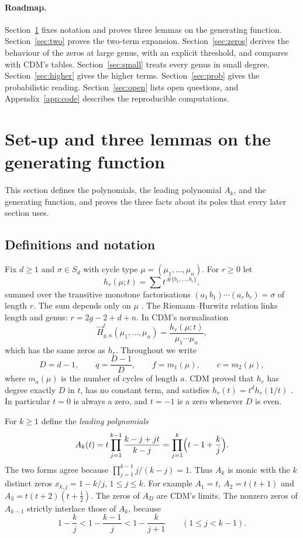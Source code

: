 \documentclass[11pt,a4paper]{article}
\theoremstyle{definition}\newtheorem{definition}[theorem]{Definition}
\theoremstyle{remark}\newtheorem{remark}[theorem]{Remark}\newtheorem{example}[theorem]{Example}
\numberwithin{equation}{section}
\begin{document}
\paragraph{Roadmap.}
Section~\ref{sec:setup} fixes notation and proves three lemmas on the generating function. Section~\ref{sec:two} proves the two-term expansion. Section~\ref{sec:zeros} derives the behaviour of the zeros at large genus, with an explicit threshold, and compares with CDM's tables. Section~\ref{sec:small} treats every genus in small degree. Section~\ref{sec:higher} gives the higher terms. Section~\ref{sec:prob} gives the probabilistic reading. Section~\ref{sec:open} lists open questions, and Appendix~\ref{app:code} describes the reproducible computations.

\section{Set-up and three lemmas on the generating function}\label{sec:setup}
This section defines the polynomials, the leading polynomial $A_k$, and the generating function, and proves the three facts about its poles that every later section uses.

\subsection{Definitions and notation}
Fix $d\ge1$ and $\sigma\in S_d$ with cycle type $\mu=(\mu_1,\dots,\mu_n)$. For $r\ge0$ let
\[
 h_r(\mu;t)=\sum t^{\,\#\{b_1,\dots,b_r\}},
\]
summed over the transitive monotone factorisations $(a_1\,b_1)\cdots(a_r\,b_r)=\sigma$ of length $r$. The sum depends only on $\mu$ \cite{cdm}. The Riemann--Hurwitz relation links length and genus: $r=2g-2+d+n$. In CDM's normalisation \cite[Definition~3.1]{cdm}
\[
 \vec H^t_{g,n}(\mu_1,\dots,\mu_n)=\frac{h_r(\mu;t)}{\mu_1\cdots\mu_n},
\]
which has the same zeros as $h_r$. Throughout we write
\[
 D=d-1,\qquad q=\frac{D-1}{D},\qquad f=m_1(\mu),\qquad c=m_2(\mu),
\]
where $m_a(\mu)$ is the number of cycles of length $a$. CDM proved that $h_r$ has degree exactly $D$ in $t$, has no constant term, and satisfies $h_r(t)=t^d h_r(1/t)$ \cite[Proposition~3.9]{cdm}. In particular $t=0$ is always a zero, and $t=-1$ is a zero whenever $D$ is even.

For $k\ge1$ define the \emph{leading polynomials}
\begin{equation}\label{eq:A}
 A_k(t)=t\prod_{j=1}^{k-1}\frac{k-j+jt}{k-j}=\prod_{j=1}^{k}\Bigl(t-1+\frac kj\Bigr).
\end{equation}
The two forms agree because $\prod_{j=1}^{k-1}j/(k-j)=1$. Thus $A_k$ is monic with the $k$ distinct zeros $x_{k,j}=1-k/j$, $1\le j\le k$. For example $A_1=t$, $A_2=t(t+1)$ and $A_3=t(t+2)(t+\tfrac12)$. The zeros of $A_D$ are CDM's limits. The nonzero zeros of $A_{k-1}$ strictly interlace those of $A_k$, because
\begin{equation}\label{eq:interlace}
 1-\frac kj<1-\frac{k-1}{j}<1-\frac k{j+1}\qquad(1\le j<k-1).
\end{equation}
\end{document}
